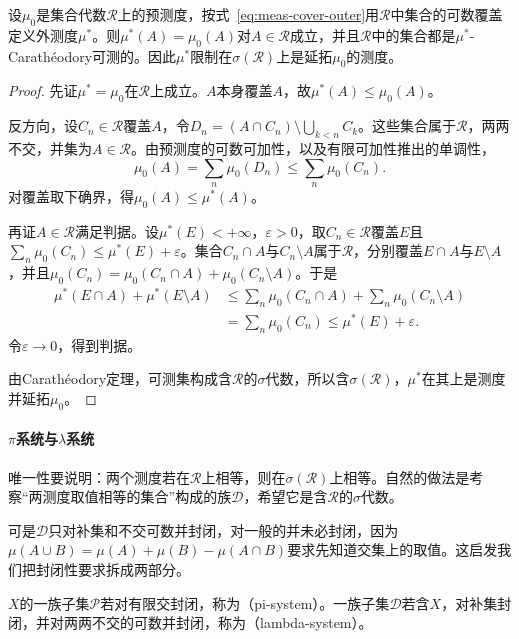 \begin{theorem}[延拓的存在性]
\label{thm:meas-extension-existence}
设$\mu_0$是集合代数$\mathcal R$上的预测度，按式~\eqref{eq:meas-cover-outer}用$\mathcal R$中集合的可数覆盖定义外测度$\mu^*$。则$\mu^*(A)=\mu_0(A)$对$A\in\mathcal R$成立，并且$\mathcal R$中的集合都是$\mu^*$-Carathéodory可测的。因此$\mu^*$限制在$\sigma(\mathcal R)$上是延拓$\mu_0$的测度。
\end{theorem}

\begin{proof}
先证$\mu^*=\mu_0$在$\mathcal R$上成立。$A$本身覆盖$A$，故$\mu^*(A)\leq\mu_0(A)$。

反方向，设$C_n\in\mathcal R$覆盖$A$，令$D_n=(A\cap C_n)\setminus\bigcup_{k<n}C_k$。这些集合属于$\mathcal R$，两两不交，并集为$A\in\mathcal R$。由预测度的可数可加性，以及有限可加性推出的单调性，
\[
 \mu_0(A)=\sum_n\mu_0(D_n)\leq\sum_n\mu_0(C_n).
\]
对覆盖取下确界，得$\mu_0(A)\leq\mu^*(A)$。

再证$A\in\mathcal R$满足判据。设$\mu^*(E)<+\infty$，$\varepsilon>0$，取$C_n\in\mathcal R$覆盖$E$且$\sum_n\mu_0(C_n)\leq\mu^*(E)+\varepsilon$。集合$C_n\cap A$与$C_n\setminus A$属于$\mathcal R$，分别覆盖$E\cap A$与$E\setminus A$，并且$\mu_0(C_n)=\mu_0(C_n\cap A)+\mu_0(C_n\setminus A)$。于是
\[
\begin{aligned}
 \mu^*(E\cap A)+\mu^*(E\setminus A)
 &\leq\sum_n\mu_0(C_n\cap A)+\sum_n\mu_0(C_n\setminus A)\\
 &=\sum_n\mu_0(C_n)\leq\mu^*(E)+\varepsilon.
\end{aligned}
\]
令$\varepsilon\to0$，得到判据。

由Carathéodory定理，可测集构成含$\mathcal R$的$\sigma$代数，所以含$\sigma(\mathcal R)$，$\mu^*$在其上是测度并延拓$\mu_0$。
\end{proof}

\paragraph{$\pi$系统与$\lambda$系统}
唯一性要说明：两个测度若在$\mathcal R$上相等，则在$\sigma(\mathcal R)$上相等。自然的做法是考察“两测度取值相等的集合”构成的族$\mathcal D$，希望它是含$\mathcal R$的$\sigma$代数。

可是$\mathcal D$只对补集和不交可数并封闭，对一般的并未必封闭，因为$\mu(A\cup B)=\mu(A)+\mu(B)-\mu(A\cap B)$要求先知道交集上的取值。这启发我们把封闭性要求拆成两部分。

\begin{definition}
\label{def:meas-pi-lambda-systems}
$X$的一族子集$\mathcal P$若对有限交封闭，称为（pi-system）。一族子集$\mathcal D$若含$X$，对补集封闭，并对两两不交的可数并封闭，称为（lambda-system）。
\end{definition}

